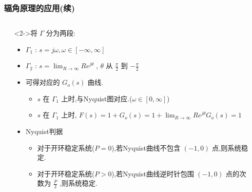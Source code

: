 \documentclass[table]{beamer}
\begin{document}
\begin{frame}
\frametitle{辐角原理的应用(续)}
\label{sec-1-4}
\begin{columns}
\begin{column}{0.2\textwidth}
\label{sec-1-4-1}

\end{column}
\begin{column}{0.8\textwidth}
\begin{block}<2->{将 $\Gamma$ 分为两段:}
\label{sec-1-4-2}

\begin{itemize}
\item $\Gamma_1$ : $s=j\omega,\omega\in[-\infty,\infty]$
\item $\Gamma_2$ : $s=\lim_{R\rightarrow\infty}Re^{j\theta}$ , $\theta$ 从 $\frac{\pi}{2}$ 到 $-\frac{\pi}{2}$
\item 可得对应的 $G_o(s)$ 曲线.
\begin{itemize}
\item $s$ 在 $\Gamma_1$ 上时,与Nyquist图对应.($\omega\in[0,\infty]$)
\item $s$ 在 $\Gamma_1$ 上时, $F(s)=1+G_o(s)=1+\lim_{R\rightarrow\infty}Re^{j\theta}G_o(s)=1$
\end{itemize}
\item <3-> Nyquist判据
\begin{itemize}
\item 对于开环稳定系统($P=0$),若Nyquist曲线不包含 $(-1,0)$ 点,则系统稳定.
\item 对于开环稳定系统($P>0$),若Nyquist曲线逆时针包围 $(-1,0)$ 点的次数为 $\frac{P}{2}$ ,则系统稳定.
\end{itemize}
\end{itemize}
\end{block}
\end{column}
\end{columns}
\end{frame}
\end{document}
